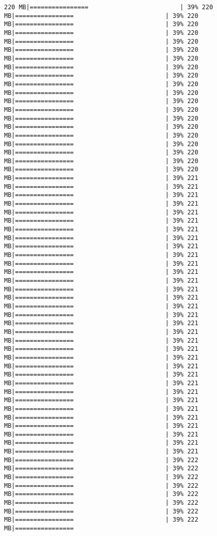 \documentclass[
]{article}
\begin{document}
\begin{verbatim}
220 MB|================                         | 39% 220 MB|================                         | 39% 220 MB|================                         | 39% 220 MB|================                         | 39% 220 MB|================                         | 39% 220 MB|================                         | 39% 220 MB|================                         | 39% 220 MB|================                         | 39% 220 MB|================                         | 39% 220 MB|================                         | 39% 220 MB|================                         | 39% 220 MB|================                         | 39% 220 MB|================                         | 39% 220 MB|================                         | 39% 220 MB|================                         | 39% 220 MB|================                         | 39% 220 MB|================                         | 39% 220 MB|================                         | 39% 220 MB|================                         | 39% 220 MB|================                         | 39% 220 MB|================                         | 39% 221 MB|================                         | 39% 221 MB|================                         | 39% 221 MB|================                         | 39% 221 MB|================                         | 39% 221 MB|================                         | 39% 221 MB|================                         | 39% 221 MB|================                         | 39% 221 MB|================                         | 39% 221 MB|================                         | 39% 221 MB|================                         | 39% 221 MB|================                         | 39% 221 MB|================                         | 39% 221 MB|================                         | 39% 221 MB|================                         | 39% 221 MB|================                         | 39% 221 MB|================                         | 39% 221 MB|================                         | 39% 221 MB|================                         | 39% 221 MB|================                         | 39% 221 MB|================                         | 39% 221 MB|================                         | 39% 221 MB|================                         | 39% 221 MB|================                         | 39% 221 MB|================                         | 39% 221 MB|================                         | 39% 221 MB|================                         | 39% 221 MB|================                         | 39% 221 MB|================                         | 39% 221 MB|================                         | 39% 221 MB|================                         | 39% 221 MB|================                         | 39% 221 MB|================                         | 39% 221 MB|================                         | 39% 222 MB|================                         | 39% 222 MB|================                         | 39% 222 MB|================                         | 39% 222 MB|================                         | 39% 222 MB|================                         | 39% 222 MB|================                         | 39% 222 MB|================                         | 39% 222 MB|================  
\end{verbatim}
\end{document}
